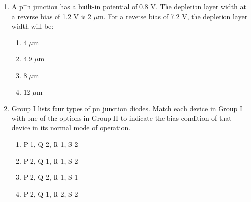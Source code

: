 \documentclass[journal,12pt,onecolumn]{IEEEtran}
\theoremstyle{remark}
\begin{document}
\begin{enumerate}
\begin{multicols}{4}
\begin{enumerate}
    \item 0
    \item $5\angle 20^\circ$
    \item $12.5\angle 30^\circ$
    \item $17\angle 30^\circ$
\end{enumerate}
\end{multicols}

\item A p$^+$n junction has a built-in potential of 0.8 V. The depletion layer width at a reverse bias of 1.2 V is 2 $\mu$m. For a reverse bias of 7.2 V, the depletion layer width will be:
\hfill{}
\begin{multicols}{4}
\begin{enumerate}
    \item 4 $\mu$m
    \item 4.9 $\mu$m
    \item 8 $\mu$m
    \item 12 $\mu$m
\end{enumerate}
\end{multicols}

\item Group I lists four types of pn junction diodes. Match each device in Group I with one of the options in Group II to indicate the bias condition of that device in its normal mode of operation. 


\hfill{}
\begin{enumerate}
    \item P-1, Q-2, R-1, S-2
    \item P-2, Q-1, R-1, S-2
    \item P-2, Q-2, R-1, S-1
    \item P-2, Q-1, R-2, S-2
\end{enumerate}


\end{enumerate}
\end{document}
